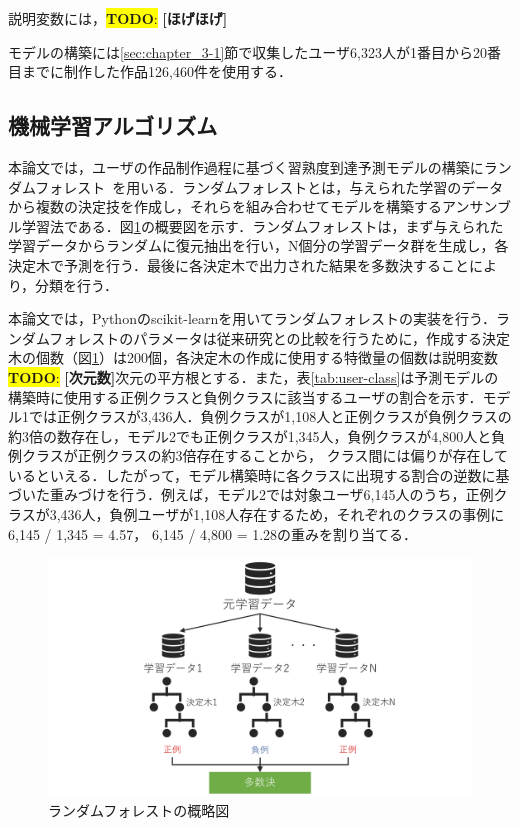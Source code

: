 \documentclass[11pt,dvipdfmx]{jreport}
\newcommand{\todo}[1]{\colorbox{yellow}{{\bf TODO}:}{\color{red} {\textbf{[#1]}}}}
\begin{document}
説明変数には，\todo{ほげほげ}

モデルの構築には\ref{sec:chapter_3-1}節で収集したユーザ6,323人が1番目から20番目までに制作した作品126,460件を使用する．

\subsection{機械学習アルゴリズム}
本論文では，ユーザの作品制作過程に基づく習熟度到達予測モデルの構築にランダムフォレスト~\cite{Breiman_2001}を用いる．ランダムフォレストとは，与えられた学習のデータから複数の決定技を作成し，それらを組み合わせてモデルを構築するアンサンブル学習法である．図\ref{fig:random-forest}の概要図を示す．ランダムフォレストは，まず与えられた学習データからランダムに復元抽出を行い，N個分の学習データ群を生成し，各決定木で予測を行う．最後に各決定木で出力された結果を多数決することにより，分類を行う．

本論文では，Pythonのscikit-learnを用いてランダムフォレストの実装を行う．ランダムフォレストのパラメータは従来研究との比較を行うために，作成する決定木の個数（図\ref{fig:random-forest}）は200個，各決定木の作成に使用する特徴量の個数は説明変数\todo{次元数}次元の平方根とする．また，表\ref{tab:user-class}は予測モデルの構築時に使用する正例クラスと負例クラスに該当するユーザの割合を示す．モデル1では正例クラスが3,436人．負例クラスが1,108人と正例クラスが負例クラスの約3倍の数存在し，モデル2でも正例クラスが1,345人，負例クラスが4,800人と負例クラスが正例クラスの約3倍存在することから， クラス間には偏りが存在しているといえる．したがって，モデル構築時に各クラスに出現する割合の逆数に基づいた重みづけを行う．例えば，モデル2では対象ユーザ6,145人のうち，正例クラスが3,436人，負例ユーザが1,108人存在するため，それぞれのクラスの事例に6,145 / 1,345 = 4.57， 6,145 / 4,800 = 1.28の重みを割り当てる．

\begin{figure}[t]
	\centering
	\includegraphics[width=1.0\linewidth]{Okamoto_fig/random-forest.pdf}
	\caption{ランダムフォレストの概略図}
	\label{fig:random-forest}
\end{figure}
\end{document}
